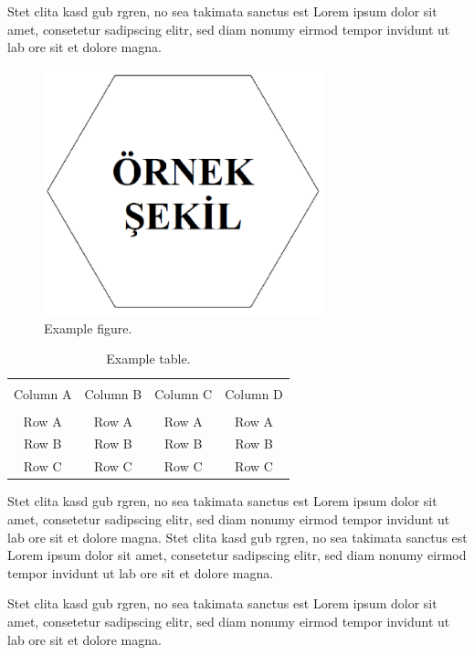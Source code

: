 
Stet clita kasd gub rgren, no sea takimata sanctus est Lorem ipsum dolor sit amet, consetetur sadipscing elitr, sed diam nonumy eirmod tempor invidunt ut lab ore sit et dolore magna\footnotemark.


\begin{figure}[t]
	\centering
	\includegraphics[width=230pt,keepaspectratio=true]{./fig/sekil6}
	\caption{Example figure.}
	\label{Figure4.1}
\end{figure}

\begin{table}[h]
	{\setlength{\tabcolsep}{14pt}
		\caption{Example table.}
		\begin{center}
			\vspace{-6mm}
			\begin{tabular}{cccc}
				\hline \\[-2.45ex] \hline \\[-2.1ex]
				Column A & Column B & Column C & Column D \\
				\hline \\[-1.8ex]
				Row A & Row A & Row A & Row A \\
				Row B & Row B & Row B & Row B \\
				Row C & Row C & Row C & Row C \\
				[-0ex] \hline
			\end{tabular}
			\vspace{-6mm}
		\end{center}
		\label{Table4.1}}
\end{table}

Stet clita kasd gub rgren, no sea takimata sanctus est Lorem ipsum dolor sit amet, consetetur sadipscing elitr, sed diam nonumy eirmod tempor invidunt ut lab ore sit et dolore magna. Stet clita kasd gub rgren, no sea takimata sanctus est Lorem ipsum dolor sit amet, consetetur sadipscing elitr, sed diam nonumy eirmod tempor invidunt ut lab ore sit et dolore magna.

Stet clita kasd gub rgren, no sea takimata sanctus est Lorem ipsum dolor sit amet, consetetur sadipscing elitr, sed diam nonumy eirmod tempor invidunt ut lab ore sit et dolore magna.  
